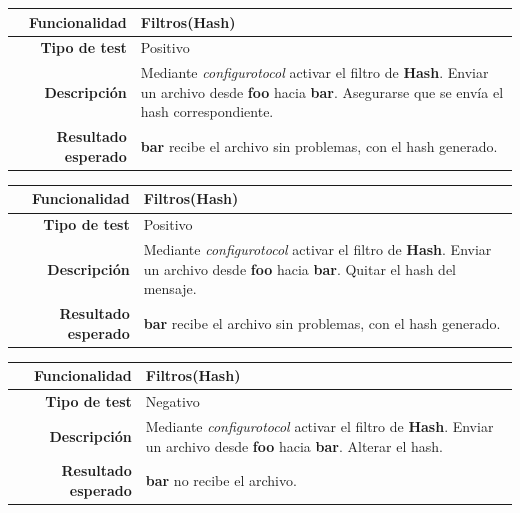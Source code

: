 \documentclass[a4paper,10pt]{article}
\begin{document}
\begin{center}
  \begin{tabular}{|r|p{12.5cm}|}
    \hline
    \textbf{Funcionalidad}	&	Filtros(Hash)\\
    \hline
    \textbf{Tipo de test}	&	Positivo\\
    \hline
    \textbf{Descripción}	&	Mediante \textit{configurotocol} activar el filtro de \textbf{Hash}. 
					Enviar un archivo desde \textbf{foo} hacia \textbf{bar}. Asegurarse que 
					se envía el hash correspondiente.\\
    \hline
    \textbf{Resultado esperado}	&	\textbf{bar} recibe el archivo sin problemas, con el hash generado.\\
    \hline   
  \end{tabular}
\end{center}

\begin{center}
  \begin{tabular}{|r|p{12.5cm}|}
    \hline
    \textbf{Funcionalidad}	&	Filtros(Hash)\\
    \hline
    \textbf{Tipo de test}	&	Positivo\\
    \hline
    \textbf{Descripción}	&	Mediante \textit{configurotocol} activar el filtro de \textbf{Hash}. 
					Enviar un archivo desde \textbf{foo} hacia \textbf{bar}. Quitar el hash del mensaje.\\
    \hline
    \textbf{Resultado esperado}	&	\textbf{bar} recibe el archivo sin problemas, con el hash generado.\\
    \hline   
  \end{tabular}
\end{center}

\begin{center}
  \begin{tabular}{|r|p{12.5cm}|}
    \hline
    \textbf{Funcionalidad}	&	Filtros(Hash)\\
    \hline
    \textbf{Tipo de test}	&	Negativo\\
    \hline
    \textbf{Descripción}	&	Mediante \textit{configurotocol} activar el filtro de \textbf{Hash}. 
					Enviar un archivo desde \textbf{foo} hacia \textbf{bar}. Alterar el hash.\\
    \hline
    \textbf{Resultado esperado}	&	\textbf{bar} no recibe el archivo.\\
    \hline   
  \end{tabular}
\end{center}
\end{document}
